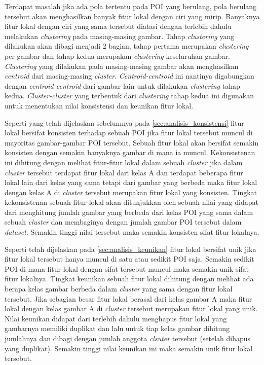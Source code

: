  Terdapat masalah jika ada pola tertentu pada POI yang berulang, pola berulang tersebut akan menghasilkan banyak fitur lokal dengan ciri yang mirip. Banyaknya fitur lokal dengan ciri yang sama tersebut diatasi dengan terlebih dahulu melakukan \textit{clustering} pada masing-masing gambar. Tahap \textit{clustering} yang dilakukan akan dibagi menjadi 2 bagian, tahap pertama merupakan \textit{clustering} per gambar dan tahap kedua merupakan \textit{clustering} keseluruhan gambar. \textit{Clustering} yang dilakukan pada masing-masing gambar akan menghasilkan \textit{centroid} dari masing-masing \textit{cluster}. \textit{Centroid-centroid} ini nantinya digabungkan dengan \textit{centroid-centroid} dari gambar lain untuk dilakukan \textit{clustering} tahap kedua. \textit{Cluster-cluster} yang terbentuk dari \textit{clustering} tahap kedua ini digunakan untuk menentukan nilai konsistensi dan keunikan fitur lokal. 

Seperti yang telah dijelaskan sebelumnya pada \ref{sec:analisis_konsistensi} fitur lokal bersifat konsisten terhadap sebuah POI jika fitur lokal tersebut muncul di mayoritas gambar-gambar POI tersebut. Sebuah fitur lokal akan bersifat semakin konsisten dengan semakin banyaknya gambar di mana ia muncul. Kekonsistenan ini dihitung dengan melihat fitur-fitur lokal dalam sebuah \textit{cluster} jika dalam \textit{cluster} tersebut terdapat fitur lokal dari kelas A dan terdapat beberapa fitur lokal lain dari kelas yang sama tetapi dari gambar yang berbeda maka fitur lokal dengan kelas A di \textit{cluster} tersebut merupakan fitur lokal yang konsisten. Tingkat kekonsistenan sebuah fitur lokal akan ditunjukkan oleh sebuah nilai yang didapat dari menghitung jumlah gambar yang berbeda dari kelas POI yang sama dalam sebuah \textit{cluster} dan membaginya dengan jumlah gambar POI tersebut dalam \textit{dataset}. Semakin tinggi nilai tersebut maka semakin konsisten sifat fitur lokalnya.

Seperti telah dijelaskan pada \ref{sec:analisis_keunikan} fitur lokal bersifat unik jika fitur lokal tersebut hanya muncul di satu atau sedikit POI saja. Semakin sedikit POI di mana fitur lokal dengan sifat tersebut muncul maka semakin unik sifat fitur lokalnya. Tingkat keunikan sebuah fitur lokal dihitung dengan melihat ada berapa kelas gambar berbeda dalam \textit{cluster} yang sama dengan fitur lokal tersebut. Jika sebagian besar fitur lokal berasal dari kelas gambar A maka fitur lokal dengan kelas gambar A di \textit{cluster} tersebut merupakan fitur lokal yang unik.  Nilai keunikan didapat dari terlebih dahulu menghapus fitur lokal yang gambarnya memiliki duplikat dan lalu untuk tiap kelas gambar dihitung jumlahnya dan dibagi dengan jumlah anggota \textit{clsuter} tersebut (setelah dihapus yang duplikat). Semakin tinggi nilai keunikan ini maka semakin unik fitur lokal tersebut.

